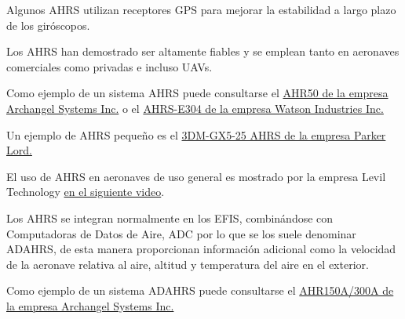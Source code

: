 Algunos \ac{AHRS} utilizan receptores \ac{GPS} para mejorar la estabilidad a largo plazo de los gir\'oscopos. 


\begin{tcolorbox}
  Los \ac{AHRS} han demostrado ser altamente fiables y se emplean
  tanto en aeronaves comerciales como privadas e incluso UAVs.

  Como ejemplo de un sistema \ac{AHRS} puede consultarse el
  \href{http://www.archangel.com/images/documents/ahr50/AHR50Overview.pdf}{AHR50
    de la empresa Archangel Systems Inc.}
o el
\href{https://watson-gyro.com/wp-content/uploads/delightful-downloads/2018/03/AHRS-E304-Spec-Sheet.pdf}{AHRS-E304 de la empresa Watson Industries Inc.}

Un ejemplo de \ac{AHRS} peque\~no es el 
\href{https://www.microstrain.com/inertial/3DM-GX5-25}{3DM-GX5-25 AHRS de la empresa Parker Lord.}

El uso de \ac{AHRS} en aeronaves de uso general es mostrado por la empresa Levil Technology 
\href{https://www.youtube.com/watch?v=1BVY7k3yeJc}{en el siguiente video}.

\end{tcolorbox}

\begin{tcolorbox}
  Los AHRS se integran normalmente en los \ac{EFIS}, combin\'andose
  con Computadoras de Datos de Aire, \ac{ADC} por lo que se los suele denominar
  \ac{ADAHRS}, de esta manera proporcionan información adicional como
  la velocidad de la aeronave relativa al aire, altitud y temperatura
  del aire en el exterior.

  Como ejemplo de un sistema \ac{ADAHRS} puede consultarse el 
  \href{http://www.archangel.com/images/documents/ahr150/AHR150overview.pdf}{AHR150A/300A de la empresa Archangel Systems Inc.}
\end{tcolorbox}






